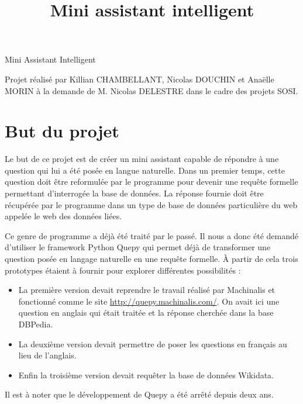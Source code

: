 \documentclass[11pt,a4paper]{article}
\title{Mini assistant intelligent}
\author{}
\begin{document}

\Huge
\begin{center}
  Mini Assistant Intelligent
\end{center}
\normalsize
Projet réalisé par Killian CHAMBELLANT, Nicolas DOUCHIN et Anaëlle MORIN à la demande de M. Nicolas DELESTRE dans le cadre des projets SOSI.


\section*{But du projet}\par
Le but de ce projet est de créer un mini assistant capable de répondre à une question qui lui a été posée en langue naturelle. 
Dans un premier temps, cette question doit être reformulée par le programme pour devenir une requête formelle permettant d'interrogée la base de données. La réponse fournie doit être récupérée par le programme dans un type de base de données particulière du web appelée le web des données liées.\par 
Ce genre de programme a déjà été traité par le passé. Il nous a donc été demandé d'utiliser le framework Python Quepy qui permet déjà de transformer une question posée en langage naturelle en une requête formelle. À partir de cela trois prototypes étaient à fournir pour explorer différentes possibilités : \par
\begin{itemize}
\item La première version devait reprendre le travail réalisé par Machinalis et fonctionné comme le site \url{http://quepy.machinalis.com/}. On avait ici une question en anglais qui était traitée et la réponse cherchée dans la base DBPedia.
\item La deuxième version devait permettre de poser les questions en français au lieu de l'anglais.
\item Enfin la troisième version devait requêter la base de données Wikidata.
\end{itemize}\par
Il est à noter que le développement de Quepy a été arrêté depuis deux ans.
\end{document}
